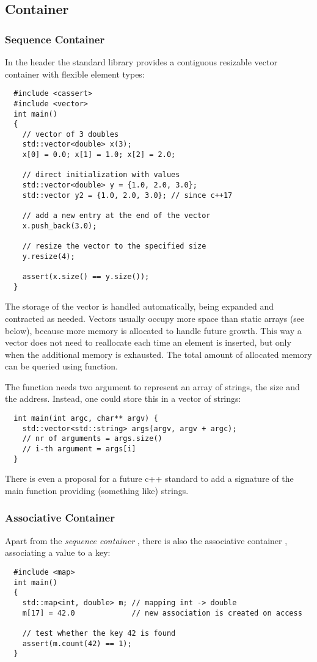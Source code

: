 \subsection{Container}
\subsubsection{Sequence Container}
In the header  the standard library provides a contiguous resizable vector container with flexible element types:
\begin{verbatim}
  #include <cassert>
  #include <vector>
  int main()
  {
    // vector of 3 doubles
    std::vector<double> x(3);
    x[0] = 0.0; x[1] = 1.0; x[2] = 2.0;

    // direct initialization with values
    std::vector<double> y = {1.0, 2.0, 3.0};
    std::vector y2 = {1.0, 2.0, 3.0}; // since c++17

    // add a new entry at the end of the vector
    x.push_back(3.0);

    // resize the vector to the specified size
    y.resize(4);

    assert(x.size() == y.size());
  }
\end{verbatim}

The storage of the vector is handled automatically, being expanded and contracted as needed. Vectors usually occupy more space than static arrays (see below), because more memory is allocated to handle future growth. This way a vector does not need to reallocate each time an element is inserted, but only when the additional memory is exhausted. The total amount of allocated memory can be queried using  function.

\begin{rem}
  The  function needs two argument to represent an array of strings, the size and the address. Instead, one could store this in a vector of strings:
  \begin{verbatim}
  int main(int argc, char** argv) {
    std::vector<std::string> args(argv, argv + argc);
    // nr of arguments = args.size()
    // i-th argument = args[i]
  }
  \end{verbatim}
  There is even a proposal for a future c++ standard to add a signature of the main function providing (something like) strings.
\end{rem}

\subsubsection{Associative Container}
Apart from the \emph{sequence container} , there is also the associative container , associating a value to a key:
\begin{verbatim}
  #include <map>
  int main()
  {
    std::map<int, double> m; // mapping int -> double
    m[17] = 42.0             // new association is created on access

    // test whether the key 42 is found
    assert(m.count(42) == 1);
  }
\end{verbatim}

